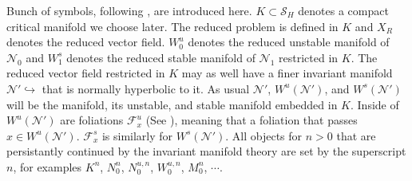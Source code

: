 \documentclass[a4paper,11pt]{article}
\theoremstyle{remark}
\begin{document}
Bunch of symbols, following \cite{Sz1991}, are introduced here. %
$K\subset\mathcal{S}_H$ denotes a compact critical manifold we choose later. The reduced problem is defined in $K$ and $X_R$ denotes the reduced vector field. $W_0^u$ denotes the reduced unstable manifold of $\mathcal{N}_0$ and $W_1^s$ denotes the reduced stable manifold of $\mathcal{N}_1$ restricted in $K$. The reduced vector field restricted in $K$ may as well have a finer invariant manifold $\mathcal{N}' \hookrightarrow$ that is normally hyperbolic to it. As usual $\mathcal{N'}$, $W^u(\mathcal{N}')$, and $W^s(\mathcal{N}')$ will be the manifold, its unstable, and stable manifold embedded in $K$. Inside of $W^u(\mathcal{N}')$ are foliations $\mathcal{F}^u_x$ (See \cite[Theorem 12.2]{fenichel_geometric_1979}), meaning that a foliation that passes $x\in W^u(\mathcal{N}')$. $\mathcal{F}^s_x$ is similarly for $W^s(\mathcal{N}')$.
All objects for $n>0$ that are persistantly continued by the invariant manifold theory are set by the superscript $n$, for examples $K^n$, $N_0^n$, $N_0^{u,n}$, $W_0^{u,n}$, $M_0^n$, $\cdots$. 
\end{document}
